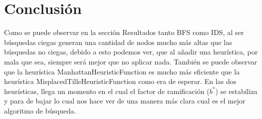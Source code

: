 \documentclass[a4paper]{article}
\begin{document}
\section{Conclusión}
Como se puede observar en la sección Resultados tanto BFS como IDS, al ser búsquedas ciegas generan una cantidad de nodos mucho más altas que las búsquedas no ciegas, debido a esto podemos ver, que al añadir una heurística, por mala que sea, siempre será mejor que no aplicar nada. También se puede observar que la heurística ManhattanHeuristicFunction es mucho más eficiente que la heurística MisplacedTilleHeuristicFunction como era de esperar. En las dos heurísticas, llega un momento en el cual el factor de ramificación ($b^{*}$) se estabiliza y para de bajar lo cual nos hace ver de una manera más clara cual es el mejor algoritmo de búsqueda.
\end{document}

